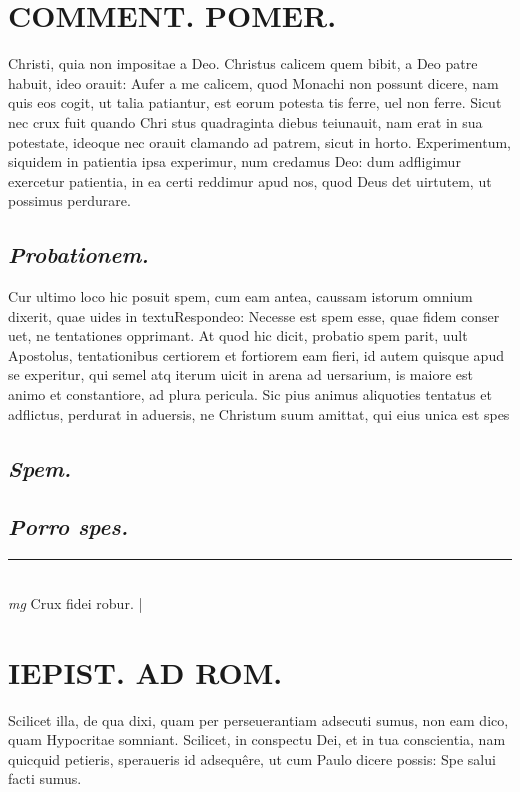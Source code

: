 \documentclass{article}
\begin{document}
\begin{pages}
\section*{COMMENT. POMER.  }\pstart Christi, quia non impositae a Deo. Christus calicem quem bibit, a Deo patre habuit, ideo orauit: Aufer a me calicem, quod Monachi non possunt dicere, nam quis eos cogit, ut talia patiantur, est eorum potesta tis ferre, uel non ferre. Sicut nec crux fuit quando Chri stus quadraginta diebus teiunauit, nam erat in sua potestate, ideoque nec orauit clamando ad patrem, sicut in horto.  \pend\pstart Experimentum, siquidem in patientia ipsa experimur, num credamus Deo: dum adfligimur exercetur patientia, in ea certi reddimur apud nos, quod Deus det uirtutem, ut possimus perdurare.   \pend
{}
{}
\subsection*{\textit{Probationem. }}\pstart Cur ultimo loco hic posuit spem, cum eam antea, caussam istorum omnium dixerit, quae uides in textuRespondeo: Necesse est spem esse, quae fidem conser uet, ne tentationes opprimant. At quod hic dicit, probatio spem parit, uult Apostolus, tentationibus certiorem et fortiorem eam fieri, id autem quisque apud se experitur, qui semel atq iterum uicit in arena ad uersarium, is maiore est animo et constantiore, ad plura pericula. Sic pius animus aliquoties tentatus et adflictus, perdurat in aduersis, ne Christum suum amittat, qui eius unica est spes\pend
{}
{}
\subsection*{\textit{Spem. }}
{}
\subsection*{\textit{Porro spes. }}
\vspace{0.5cm}\noindent
\vspace{0.2cm}\rule{1cm}{0.2pt}\\ 
\hspace{0.2cm}\textit{mg}
\footnotesize Crux fidei robur.  
\normalsize| 
\section*{IEPIST. AD ROM.  }
\marginpar{[ p.50 ]}\pstart Scilicet illa, de qua dixi, quam per perseuerantiam adsecuti sumus, non eam dico, quam Hypocritae somniant.  \pend\pstart Scilicet, in conspectu Dei, et in tua conscientia, nam quicquid petieris, speraueris id adsequêre, ut cum Paulo dicere possis: Spe salui facti sumus.   \pend
{}
{}

\end{pages}
\end{document}
